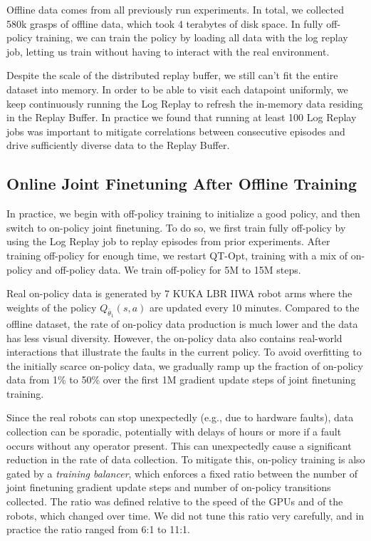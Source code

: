 \documentclass{article}
\newcommand{\numgrasps}{{580k}} %
\begin{document}
Offline data comes from all previously run experiments. In total, we collected \numgrasps{} grasps of offline data, which took 4 terabytes of disk space.
 In fully off-policy training, we can train the policy by loading all data with the log replay job, letting us train without having to interact with the real environment.

Despite the scale of the distributed replay buffer, we still can't fit the entire dataset into memory. In order to be able to visit each datapoint uniformly, we keep continuously running the Log Replay to refresh the in-memory data residing in the Replay Buffer. In practice we found that running at least 100 Log Replay jobs was important to mitigate correlations between consecutive episodes and drive sufficiently diverse data to the Replay Buffer.

\subsection{Online Joint Finetuning After Offline Training}\label{sec:policy_fine_tuning}

In practice, we begin with off-policy training to initialize a good policy, and then switch to on-policy joint finetuning. To do so, we first train fully off-policy by using the Log Replay job to replay episodes from prior experiments. After training off-policy for enough time, we restart QT-Opt, training with a mix of on-policy and off-policy data. We train off-policy for 5M to 15M steps.

Real on-policy data is generated by 7 KUKA LBR IIWA robot arms where the weights of the policy $Q_{\bar{\theta}_1}(s,a)$ are updated every 10 minutes. Compared to the offline dataset, the rate of on-policy data production is much lower and the data has less visual diversity. However, the on-policy data also contains real-world interactions that illustrate the faults in the current policy. To avoid overfitting to the initially scarce on-policy data, we gradually ramp up the fraction of on-policy data from 1\% to 50\% over the first 1M gradient update steps of joint finetuning training.


Since the real robots can stop unexpectedly (e.g., due to hardware faults), data collection can be sporadic, potentially with delays of hours or more if a fault occurs without any operator present. This can unexpectedly cause a significant reduction in the rate of data collection. To mitigate this, on-policy training is also gated by a \textit{training balancer}, which enforces a fixed ratio between the number of joint finetuning gradient update steps and number of on-policy transitions collected. The ratio was defined relative to the speed of the GPUs and of the robots, which changed over time. We did not tune this ratio very carefully, and in practice the ratio ranged from 6:1 to 11:1.
\end{document}
